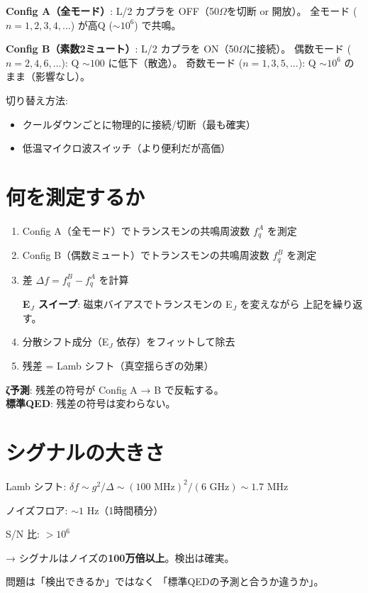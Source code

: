 \documentclass[12pt,a4paper]{article}
\begin{document}
\begin{expbox}[2つの配置を切り替える]
\textbf{Config A（全モード）}: L/2 カプラを OFF（50$\Omega$を切断 or 開放）。
全モード ($n=1,2,3,4,\ldots$) が高Q ($\sim 10^6$) で共鳴。

\textbf{Config B（素数2ミュート）}: L/2 カプラを ON（50$\Omega$に接続）。
偶数モード ($n=2,4,6,\ldots$): Q $\sim 100$ に低下（散逸）。
奇数モード ($n=1,3,5,\ldots$): Q $\sim 10^6$ のまま（影響なし）。

切り替え方法:
\begin{itemize}
\item クールダウンごとに物理的に接続/切断（最も確実）
\item 低温マイクロ波スイッチ（より便利だが高価）
\end{itemize}
\end{expbox}

\section{何を測定するか}

\begin{expbox}[測定プロトコル]
\begin{enumerate}
\item Config A（全モード）でトランスモンの共鳴周波数 $f_q^A$ を測定
\item Config B（偶数ミュート）でトランスモンの共鳴周波数 $f_q^B$ を測定
\item 差 $\Delta f = f_q^B - f_q^A$ を計算

\textbf{E$_J$ スイープ}: 磁束バイアスでトランスモンの E$_J$ を変えながら
上記を繰り返す。

\item 分散シフト成分（E$_J$ 依存）をフィットして除去
\item 残差 = Lamb シフト（真空揺らぎの効果）
\end{enumerate}

\textbf{ζ予測}: 残差の符号が Config A → B で反転する。\\
\textbf{標準QED}: 残差の符号は変わらない。
\end{expbox}

\section{シグナルの大きさ}

\begin{mathbox}[定量的見積もり]
Lamb シフト: $\delta f \sim g^2/\Delta \sim (100\text{ MHz})^2 / (6\text{ GHz}) \sim 1.7\text{ MHz}$

ノイズフロア: $\sim 1$ Hz（1時間積分）

S/N 比: $> 10^6$

→ シグナルはノイズの\textbf{100万倍以上}。検出は確実。

問題は「検出できるか」ではなく
「標準QEDの予測と合うか違うか」。
\end{mathbox}
\end{document}
